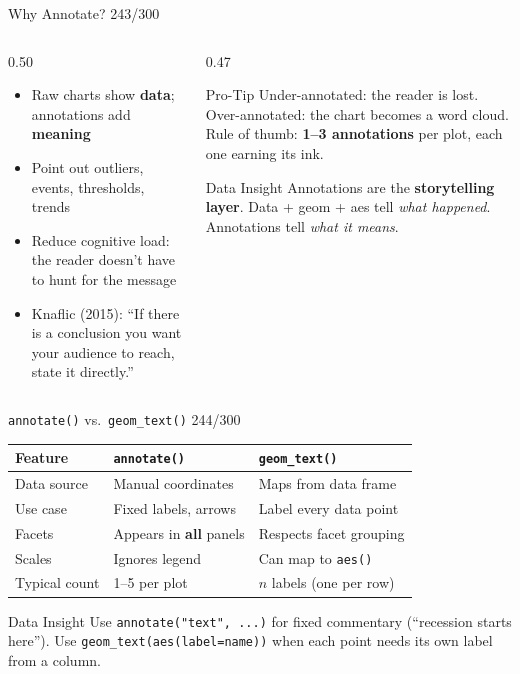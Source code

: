 \documentclass[10pt]{beamer}
\newcommand{\smark}[1]{\hfill{\scriptsize\color{codegray}#1}}
\begin{document}
\begin{frame}{Why Annotate?}
\smark{243/300}
\begin{columns}[T]
\begin{column}{0.50\textwidth}
\begin{itemize}
    \item Raw charts show \textbf{data}; annotations add \textbf{meaning}
    \item Point out outliers, events, thresholds, trends
    \item Reduce cognitive load: the reader doesn't have to hunt for the message
    \item Knaflic (2015): ``If there is a conclusion you want your audience to reach, state it directly.''
\end{itemize}
\end{column}
\begin{column}{0.47\textwidth}
\begin{alertblock}{Pro-Tip}
    \scriptsize Under-annotated: the reader is lost. Over-annotated: the chart becomes a word cloud. Rule of thumb: \textbf{1--3 annotations} per plot, each one earning its ink.
\end{alertblock}
\vspace{0.2cm}
\begin{exampleblock}{Data Insight}
    \scriptsize Annotations are the \textbf{storytelling layer}. Data + geom + aes tell \emph{what happened}. Annotations tell \emph{what it means}.
\end{exampleblock}
\end{column}
\end{columns}
\end{frame}

\begin{frame}{\texttt{annotate()} vs.\ \texttt{geom\_text()}}
\smark{244/300}
\centering\small
\begin{tabular}{@{}lll@{}}
    \toprule
    \textbf{Feature} & \texttt{annotate()} & \texttt{geom\_text()} \\
    \midrule
    Data source     & Manual coordinates       & Maps from data frame \\
    Use case        & Fixed labels, arrows      & Label every data point \\
    Facets          & Appears in \textbf{all} panels & Respects facet grouping \\
    Scales          & Ignores legend            & Can map to \texttt{aes()} \\
    Typical count   & 1--5 per plot             & $n$ labels (one per row) \\
    \bottomrule
\end{tabular}

\vspace{0.3cm}
\begin{exampleblock}{Data Insight}
    \scriptsize Use \texttt{annotate("text", ...)} for fixed commentary (``recession starts here''). Use \texttt{geom\_text(aes(label=name))} when each point needs its own label from a column.
\end{exampleblock}
\end{frame}
\end{document}
